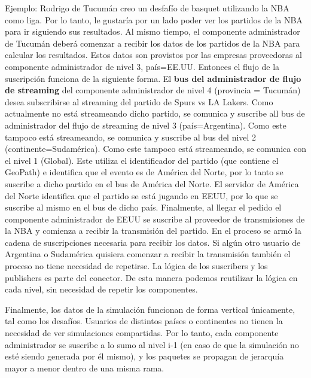 Ejemplo: Rodrigo de Tucumán creo un desfafío de basquet utilizando la NBA como liga. Por lo tanto, le gustaría por un
lado poder ver los partidos de la NBA para ir siguiendo sus resultados. Al mismo tiempo, el componente administrador
de Tucumán deberá comenzar a recibir los datos de los partidos de la NBA para calcular los resultados. Estos datos
son provistos por las empresas proveedoras al componente administrador de nivel 3, país=EE.UU.
Entonces el flujo de la suscripción funciona de la siguiente forma. El \textbf{bus del administrador de flujo de streaming} del componente administrador de nivel 4 (provincia = Tucumán)
desea subscribirse al streaming del partido de Spurs vs LA Lakers. Como actualmente no está streameando dicho partido,
se comunica y suscribe all bus de administrador del flujo de streaming de nivel 3 (país=Argentina). Como este tampoco está streameando, se comunica y suscribe al bus del nivel 2 (continente=Sudamérica). Como este tampoco está streameando, se
comunica con el  nivel 1 (Global). Este utiliza el identificador del partido (que contiene el GeoPath) e identifica que el evento es de América del Norte, por lo tanto
se suscribe a dicho partido en el bus de América del Norte. El servidor de América del Norte identifica que el partido se
está jugando en EEUU, por lo que se suscribe al mismo en el bus de dicho país. Finalmente, al llegar el pedido el componente
administrador de EEUU se suscribe al proveedor de transmisiones de la NBA y comienza a recibir la transmisión del partido.
En el proceso se armó la cadena de suscripciones necesaria para recibir los datos. Si algún otro usuario de Argentina o Sudamérica quisiera comenzar a recibir la transmisión también el proceso no tiene necesidad de repetirse.
La lógica de los suscribers y los publishers es parte del conector. De esta manera podemos reutilizar la lógica en cada
nivel, sin necesidad de repetir los componentes.

Finalmente, los datos de la simulación funcionan de forma vertical únicamente, tal como los desafíos. Usuarios de distintos países
o continentes no tienen la necesidad de ver simulaciones compartidas. Por lo tanto, cada componente administrador
se suscribe a lo sumo al nivel i-1 (en caso de que la simulación no esté siendo generada por él mismo), y los paquetes
se propagan de jerarquía mayor a menor dentro de una misma rama.

